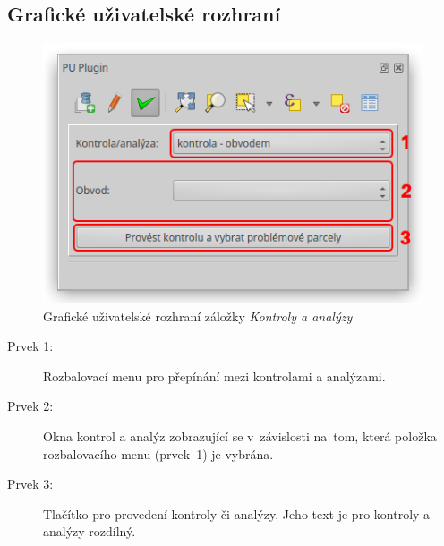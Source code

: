 \subsection{Grafické uživatelské rozhraní}
\label{editace_gui}

	\begin{figure}[H]
		\centering
		\includegraphics[width=.55\textwidth]{./pictures/ca_gui.png}
		\caption[Grafické uživatelské rozhraní záložky \textit{Kontroly a analýzy}]{Grafické uživatelské rozhraní záložky \textit{Kontroly a analýzy}}
		\label{fig:editace_gui}
 	\end{figure}

\begin{description}
	\item[Prvek 1:] Rozbalovací menu pro přepínání mezi kontrolami a analýzami.
	\item[Prvek 2:] Okna kontrol a analýz zobrazující se v~závislosti na~tom, která položka rozbalovacího menu (prvek~1) je vybrána.
	\item[Prvek 3:] Tlačítko pro provedení kontroly či analýzy. Jeho text je pro kontroly a analýzy rozdílný.
\end{description}

